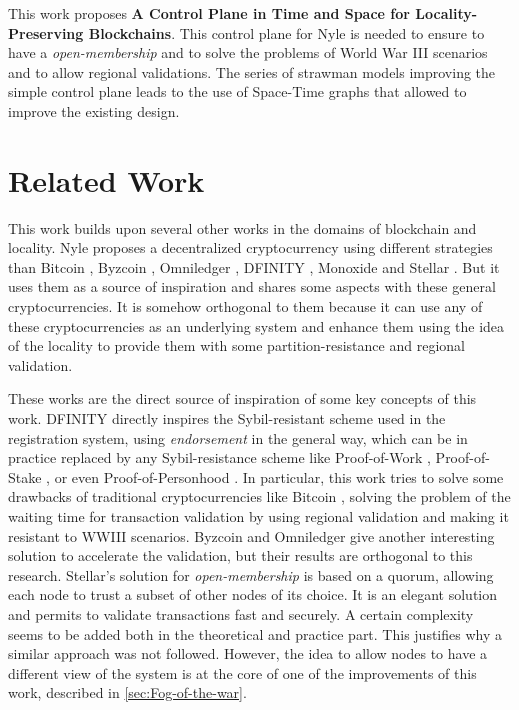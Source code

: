 \documentclass[a4paper,11pt,twoside,openright]{report}
\begin{document}

This work proposes \textbf{A Control Plane in Time and Space for
Locality-Preserving Blockchains}. This control plane for Nyle is needed to
ensure to have a \textit{open-membership} and to solve the problems of World
War III scenarios and to allow regional validations. The series of strawman
models improving the simple control plane leads to the use of Space-Time graphs
that allowed to improve the existing design. 



\chapter{Related Work} \label{chap:RelatedWork} %

This work builds upon several other works in the domains of
blockchain and locality. Nyle proposes a decentralized cryptocurrency using
different strategies than Bitcoin \cite{Nakamoto2009}, Byzcoin
\cite{Kogias2016}, Omniledger \cite{Kokoris-Kogias2017}, DFINITY
\cite{Hanke2018}, Monoxide \cite{Wang2019} and Stellar \cite{Lokhava2019}. But
it uses them as a source of inspiration and shares some aspects with these
general cryptocurrencies. It is somehow orthogonal to them because it can use
any of these cryptocurrencies as an underlying system and enhance them using
the idea of the locality to provide them with some partition-resistance and
regional validation. 

These works are the direct source of inspiration of some key concepts of this work. DFINITY
\cite{ Hanke2018} directly inspires the Sybil-resistant scheme
used in the registration system, using \textit{endorsement} in the general way, which can be
in practice replaced by any Sybil-resistance scheme like Proof-of-Work
\cite{Nakamoto2009}, Proof-of-Stake \cite{wood2014ethereum}, or even
Proof-of-Personhood \cite{Borge2017}. In particular, this work tries to solve
some drawbacks of traditional cryptocurrencies like Bitcoin
\cite{Nakamoto2009}, solving the problem of the waiting time for transaction
validation by using regional validation and making it resistant to WWIII
scenarios. Byzcoin \cite{Kogias2016} and Omniledger \cite{Kokoris-Kogias2017}
give another interesting solution to accelerate the validation, but their
results are orthogonal to this research. Stellar's solution for
\textit{open-membership} \cite{Lokhava2019} is based on a quorum, allowing each
node to trust a subset of other nodes of its choice. It is an elegant solution
and permits to validate transactions fast and securely. A certain complexity
seems to be added both in the theoretical and practice part. This justifies why
a similar approach was not followed. However, the idea to allow nodes to have a
different view of the system is at the core of one of the improvements of this
work, described in \autoref{sec:Fog-of-the-war}.
\end{document}
